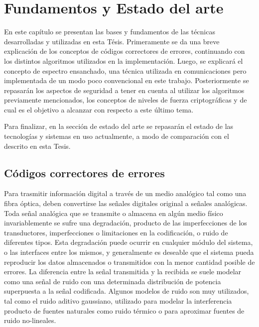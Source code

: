 \chapter{Fundamentos y Estado del arte}

En este capítulo se presentan las bases y fundamentos de las técnicas desarrolladas y utilizadas en esta Tésis. 
Primeramente se da una breve explicación de los conceptos de códigos correctores de errores, continuando con los distintos algoritmos utilizados en la implementación. Luego, se explicará el concepto de espectro ensanchado, una técnica utilizada en comunicaciones pero implementada de un modo poco convencional en este trabajo. Posteriormente se repasarán los aspectos de seguridad a tener en cuenta al utilizar los algoritmos previamente mencionados, los conceptos de niveles de fuerza criptográficas y de cual es el objetivo a alcanzar con respecto a este último tema.

Para finalizar, en la sección de estado del arte se repasarán el estado de las tecnologías y sistemas en uso actualmente, a modo de comparación con el descrito en esta Tesis.

\section{Códigos correctores de errores}

Para trasmitir información digital a través de un medio analógico tal como una fibra óptica, deben convertirse las señales digitales original a señales analógicas.
Toda señal analógica que se transmite o almacena en algún medio físico invariablemente se sufre una degradación, producto de las imperfecciones de los transductores, imperfecciones o limitaciones en la codificación, o ruido de diferentes tipos. Esta degradación puede ocurrir en cualquier módulo del sistema, o las interfaces entre los mismos, y generalmente es deseable que el sistema pueda reproducir los datos almacenados o transmitidos con la menor cantidad posible de errores. La diferencia entre la señal transmitida y la recibida se suele modelar como una señal de ruido con una determinada distribución de potencia superpuesta a la señal codificada. Algunos modelos de ruido son muy utilizados, tal como el ruido aditivo gaussiano, utilizado para modelar la interferencia producto de fuentes naturales como ruido térmico o para aproximar fuentes de ruido no-lineales.

